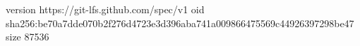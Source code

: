 version https://git-lfs.github.com/spec/v1
oid sha256:be70a7dde070b2f276d4723e3d396aba741a009866475569c44926397298be47
size 87536
